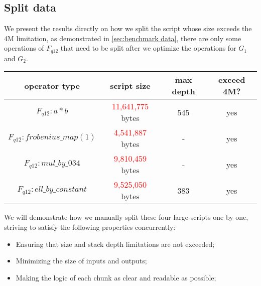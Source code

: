 \subsection{Split data} \label{sec:split-data}

We present the results directly on how we split the script whose size exceeds the 4M limitation, as demonstrated in \ref{sec:benchmark data},
there are only some operations of $F_{q12}$ that need to be split after we optimize the operations for $G_1$ and $G_2$.

\begin{center}
\begin{tabular}{|c|c|c|c|} \hline
    operator type & script size & max depth & exceed 4M? \\ \hline
    $F_{q12}: a * b$ & \textcolor{red}{11,641,775} bytes & 545 & yes \\ \hline
    $F_{q12}: frobenius\_map(1)$ & \textcolor{red}{4,541,887} bytes & - & yes \\ \hline
    $F_{q12}: mul\_by\_034$ & \textcolor{red}{9,810,459} bytes & - & yes \\ \hline
    $F_{q12}: ell\_by\_constant$ & \textcolor{red}{9,525,050} bytes & 383 & yes \\ \hline    
\end{tabular}
\end{center}


We will demonstrate how we manually split these four large scripts one by one, striving to satisfy the following properties concurrently:

\begin{itemize}
    \item Ensuring that size and stack depth limitations are not exceeded;
    \item Minimizing the size of inputs and outputs;
    \item Making the logic of each chunk as clear and readable as possible; 
\end{itemize}



